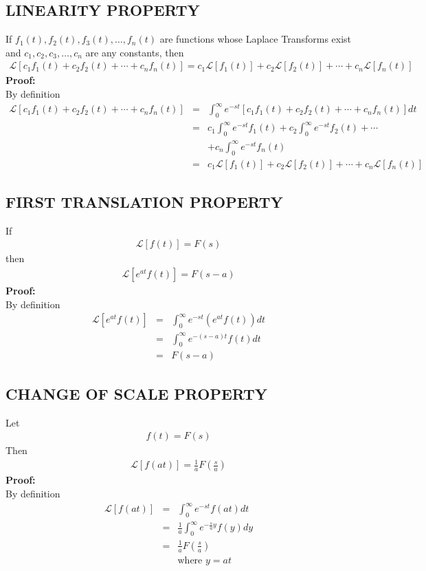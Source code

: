 \documentclass[11pt]{report}
\newcommand{\bt}[1]{\textbf{#1}}
\newcommand{\sps}{\\[0.2cm]}
\newcommand{\Laplace}{\mathcal{L}}
\newcommand{\ft}{f(t)}
\newcommand{\Fs}{F(s)}
\newcommand{\sbracket}[1]{\left[#1\right]}
\newcommand{\LFt}{\Laplace \sbracket{\ft}}
\newcommand{\LFn}[1]{\Laplace \sbracket{#1}}
\newcommand{\Lpts}{Laplace Transforms }
\begin{document}
	\subsection{LINEARITY PROPERTY}
	If $f_1(t), f_2(t), f_3(t),\ldots,f_n(t)$ are functions whose \Lpts exist and $c_1, c_2, c_3,\ldots,c_n$ are any constants, then
	\begin{eqnarray*}
		\LFn{c_1f_1(t) + c_2f_2(t) + \cdots + c_nf_n(t)} = c_1\LFn{f_1(t)} + c_2\LFn{f_2(t)} + \cdots + c_n\LFn{f_n(t)}
	\end{eqnarray*}
	\bt{Proof:}\\
	By definition
	\begin{eqnarray*}
		\LFn{c_1f_1(t) + c_2f_2(t) + \cdots + c_nf_n(t)} &=& \int_0^\infty e^{-st}\left[c_1f_1(t) + c_2f_2(t) + \cdots + c_nf_n(t)\right]dt\sps
		&=& c_1\int_0^\infty e^{-st}f_1(t) + c_2\int_0^\infty e^{-st}f_2(t) + \cdots \\
		&&+ c_n\int_0^\infty e^{-st}f_n(t)\sps
		&=& c_1\LFn{f_1(t)} + c_2\LFn{f_2(t)} + \cdots + c_n\LFn{f_n(t)}
	\end{eqnarray*}
	
	\subsection{FIRST TRANSLATION PROPERTY}
	If 
	\begin{eqnarray*}
		\LFt = \Fs
	\end{eqnarray*}
	then 
	\begin{eqnarray*}
		\LFn{e^{at}\ft} = F(s-a)
	\end{eqnarray*}
	\bt{Proof:}\\
	By definition
	\begin{eqnarray*}
		\LFn{e^{at}\ft} &=&  \int_0^\infty e^{-st}\left(e^{at}\ft\right)dt\sps
		&=& \int_0^\infty e^{-(s-a)t}\ft dt\sps
		&=& F(s-a)
	\end{eqnarray*}
	
	\subsection{CHANGE OF SCALE PROPERTY}
	Let
	\begin{eqnarray*}
		\ft = \Fs
	\end{eqnarray*}
	Then
	\begin{eqnarray*}
		\LFn{f(at)} =  \frac{1}{a}F\left(\frac{s}{a}\right)
	\end{eqnarray*}
	\bt{Proof:}\\
	By definition
	\begin{eqnarray*}
		\LFn{f(at)} &=& \int_0^\infty e^{-st} f(at)dt\sps
		&=&\frac{1}{a}\int_0^\infty e^{-\frac{s}{a}y}f(y)dy\sps
		&=& \frac{1}{a}F\left(\frac{s}{a}\right)\\
		&& \text{where } y = at
	\end{eqnarray*}
	
\end{document}
